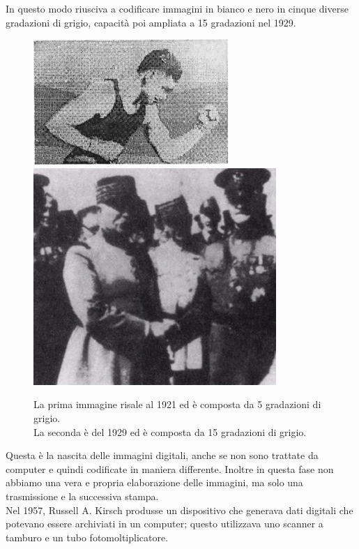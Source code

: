 
In questo modo riusciva a codificare immagini in bianco e nero in cinque diverse gradazioni di grigio, capacità poi ampliata a 15 gradazioni nel 1929.\\
\begin{figure}[htb] \centering
\includegraphics[scale=0.5, trim = 0 1.1cm 0 0, clip]{Pictures/img del 1921 a 5 gradazioni di grigio.jpg}
\qquad\qquad
\includegraphics[scale=1.7, trim = 0 1.1cm 0 0, clip]{Pictures/img del 1929 a 15 gradazioni di grigio.jpg}
\caption{La prima immagine risale al 1921 ed è composta da 5 gradazioni di grigio.\\ La seconda è del 1929 ed è composta da 15 gradazioni di grigio.}\label{fig:figura}
\end{figure}
Questa è la nascita delle immagini digitali, anche se non sono trattate da computer e quindi codificate in maniera differente. Inoltre in questa fase non abbiamo una vera e propria elaborazione delle immagini, ma solo una trasmissione e la successiva stampa.\\
\vspace{1em}
Nel 1957, Russell A. Kirsch produsse un dispositivo che generava dati digitali che potevano essere archiviati in un computer; questo utilizzava uno scanner a tamburo e un tubo fotomoltiplicatore.\\
